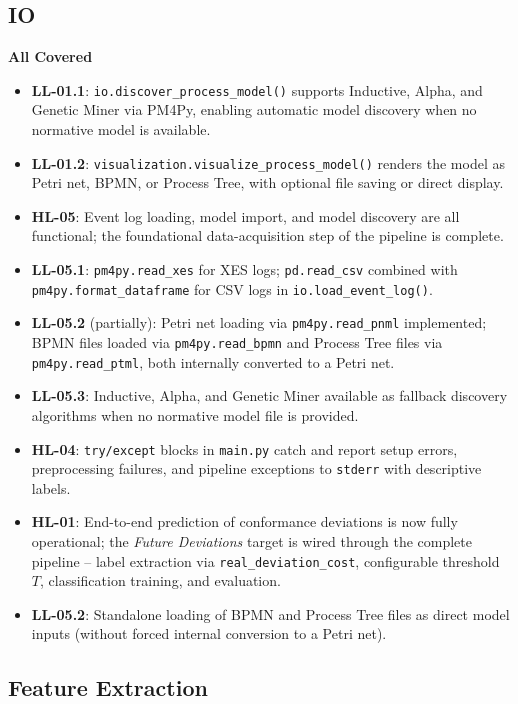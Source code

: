 \documentclass[12pt,a4paper]{article}
\newcommand{\newcov}[1]{\colorbox{green!40}{\textbf{#1}}}
\begin{document}
\subsection{IO}
\textbf{All Covered}
\begin{itemize}
    \item \textbf{LL-01.1}: \texttt{io.discover\_process\_model()} supports Inductive, Alpha, and Genetic Miner via PM4Py, enabling automatic model discovery when no normative model is available.
    \item \textbf{LL-01.2}: \texttt{visualization.visualize\_process\_model()} renders the model as Petri net, BPMN, or Process Tree, with optional file saving or direct display.
    \item \textbf{HL-05}: Event log loading, model import, and model discovery are all functional; the foundational data-acquisition step of the pipeline is complete.
    \item \textbf{LL-05.1}: \texttt{pm4py.read\_xes} for XES logs; \texttt{pd.read\_csv} combined with \texttt{pm4py.format\_dataframe} for CSV logs in \texttt{io.load\_event\_log()}.
    \item \textbf{LL-05.2} (partially): Petri net loading via \texttt{pm4py.read\_pnml} implemented; BPMN files loaded via \texttt{pm4py.read\_bpmn} and Process Tree files via \texttt{pm4py.read\_ptml}, both internally converted to a Petri net.
    \item \textbf{LL-05.3}: Inductive, Alpha, and Genetic Miner available as fallback discovery algorithms when no normative model file is provided.
    \item \textbf{HL-04}: \texttt{try/except} blocks in \texttt{main.py} catch and report setup errors, preprocessing failures, and pipeline exceptions to \texttt{stderr} with descriptive labels.
    \item \newcov{HL-01}: End-to-end prediction of conformance deviations is now fully operational; the \textit{Future Deviations} target is wired through the complete pipeline -- label extraction via \texttt{real\_deviation\_cost}, configurable threshold $T$, classification training, and evaluation.
    \item \newcov{LL-05.2}: Standalone loading of BPMN and Process Tree files as direct model inputs (without forced internal conversion to a Petri net).
\end{itemize}

\subsection{Feature Extraction}
\end{document}
